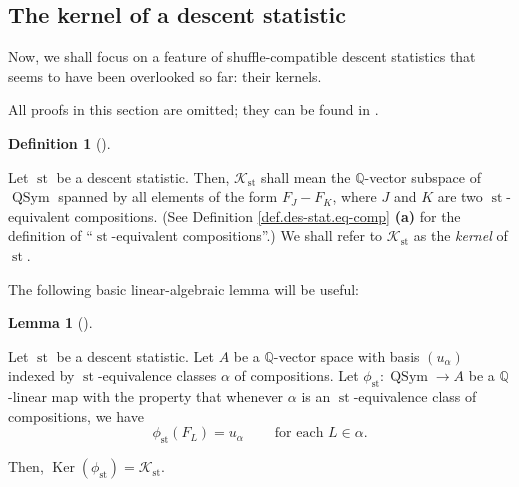 \documentclass[numbers=enddot,12pt,final,onecolumn,notitlepage]{scrartcl}%
\theoremstyle{definition}
\newtheorem{lem}[theo]{Lemma}
\newenvironment{lemma}[1][]
{\begin{lem}[#1]\begin{leftbar}}
{\end{leftbar}\end{lem}}
\newtheorem{defi}[theo]{Definition}
\newenvironment{definition}[1][]
{\begin{defi}[#1]\begin{leftbar}}
{\end{leftbar}\end{defi}}
\newenvironment{vershort}{}{}
\begin{document}
\subsection{The kernel of a descent statistic}

Now, we shall focus on a feature of shuffle-compatible descent statistics that
seems to have been overlooked so far: their kernels.

\begin{vershort}
All proofs in this section are omitted; they can be found in \cite{verlong}.
\end{vershort}

\begin{definition}
Let $\operatorname*{st}$ be a descent statistic. Then, $\mathcal{K}%
_{\operatorname*{st}}$ shall mean the $\mathbb{Q}$-vector subspace of
$\operatorname*{QSym}$ spanned by all elements of the form $F_{J}-F_{K}$,
where $J$ and $K$ are two $\operatorname*{st}$-equivalent compositions. (See
Definition \ref{def.des-stat.eq-comp} \textbf{(a)} for the definition of
\textquotedblleft$\operatorname*{st}$-equivalent
compositions\textquotedblright.) We shall refer to $\mathcal{K}%
_{\operatorname*{st}}$ as the \textit{kernel} of $\operatorname*{st}$.
\end{definition}

The following basic linear-algebraic lemma will be useful:

\begin{lemma}
\label{lem.K.fist}Let $\operatorname*{st}$ be a descent statistic. Let $A$ be
a $\mathbb{Q}$-vector space with basis $\left(  u_{\alpha}\right)  $ indexed
by $\operatorname*{st}$-equivalence classes $\alpha$ of compositions. Let
$\phi_{\operatorname*{st}}:\operatorname*{QSym}\rightarrow A$ be a
$\mathbb{Q}$-linear map with the property that whenever $\alpha$ is an
$\operatorname*{st}$-equivalence class of compositions, we have%
\begin{equation}
\phi_{\operatorname*{st}}\left(  F_{L}\right)  =u_{\alpha}%
\ \ \ \ \ \ \ \ \ \ \text{for each }L\in\alpha. \label{pf.prop.K.ideal.dir1.1}%
\end{equation}


Then, $\operatorname*{Ker}\left(  \phi_{\operatorname*{st}}\right)
=\mathcal{K}_{\operatorname*{st}}$.
\end{lemma}
\end{document}
